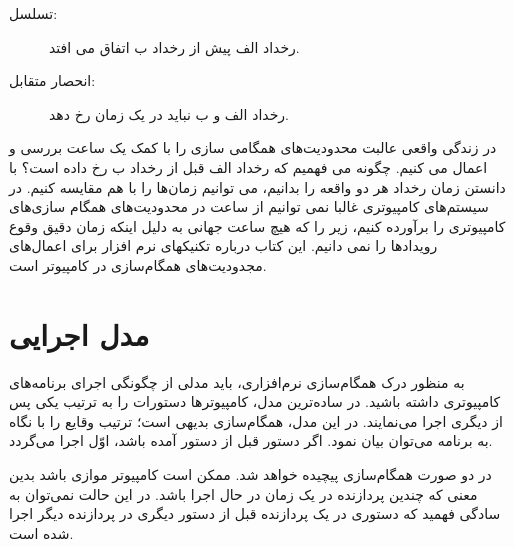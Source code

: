 \documentclass{book}
\begin{document}
\begin{description}

\item[تسلسل:] رخداد الف پیش از رخداد ب اتفاق می افتد.

\item[انحصار متقابل:] رخداد الف و ب نباید در یک زمان رخ دهد.

\end{description}
در زندگی واقعی عالبت محدودیت‌های همگامی سازی را با کمک یک ساعت بررسی و اعمال می کنیم. چگونه می فهمیم که رخداد الف قبل از رخداد ب رخ داده است؟ با دانستن زمان رخداد هر دو واقعه را بدانیم، می توانیم زمان‌ها را با هم مقایسه کنیم.
در سیستم‌های کامپیوتری غالبا نمی توانیم از ساعت در محدودیت‌های همگام سازی‌های کامپیوتری را برآورده کنیم، زیر را که هیچ ساعت جهانی به دلیل اینکه زمان دقیق وقوع رویدادها را نمی دانیم.
این کتاب درباره تکنیکهای نرم افزار برای اعمال‌های مجدودیت‌های همگام‌سازی در کامپیوتر است.



\section {مدل اجرایی}


    به منظور درک همگام‌سازی نرم‌افزاری، باید مدلی از چگونگی اجرای برنامه‌های کامپیوتری داشته باشید.
    در ساده‌ترین مدل، کامپیوترها دستورات را به ترتیب یکی پس از دیگری اجرا می‌نمایند. 
    در این مدل، همگام‌سازی بدیهی است؛‌ ترتیب وقایع را با نگاه به  برنامه می‌توان بیان نمود. 
    اگر دستور  قبل از دستور  آمده باشد، اوّل اجرا می‌گردد. 

    در دو صورت همگام‌سازی پیچیده خواهد شد. 
    ممکن است کامپیوتر موازی باشد بدین معنی که چندین پردازنده در یک زمان در حال اجرا باشد. در این حالت نمی‌توان به سادگی فهمید که 
    دستوری در یک پردازنده قبل از دستور دیگری در پردازنده دیگر اجرا شده است. 
\end{document}
